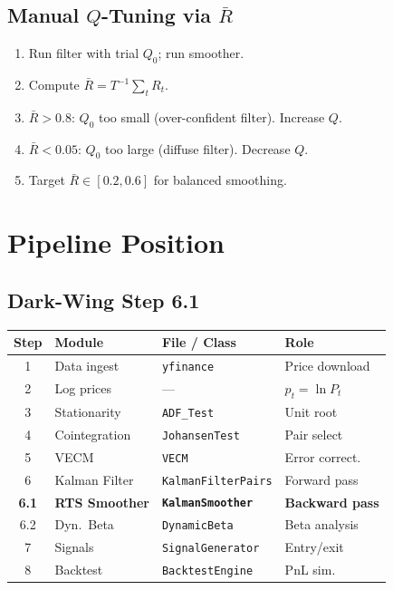 \documentclass[10pt,a4paper,twocolumn]{article}
\begin{document}
\subsection{Manual $Q$-Tuning via $\bar R$}

\begin{enumerate}\setlength\itemsep{1pt}
  \item Run filter with trial $Q_0$; run smoother.
  \item Compute $\bar{R} = T^{-1}\sum_t R_t$.
  \item $\bar{R} > 0.8$: $Q_0$ too small (over-confident filter).
        Increase $Q$.
  \item $\bar{R} < 0.05$: $Q_0$ too large (diffuse filter).
        Decrease $Q$.
  \item Target $\bar{R} \in [0.2, 0.6]$ for balanced smoothing.
\end{enumerate}

\section{Pipeline Position}

\subsection{Dark-Wing Step 6.1}

\begin{center}\small
\begin{tabular}{@{}clp{2.0cm}l@{}}
\toprule
\textbf{Step} & \textbf{Module} & \textbf{File / Class} & \textbf{Role}\\\midrule
1 & Data ingest    & \texttt{yfinance}            & Price download\\
2 & Log prices     & ---                          & $p_t = \ln P_t$\\
3 & Stationarity   & \texttt{ADF\_Test}           & Unit root\\
4 & Cointegration  & \texttt{JohansenTest}        & Pair select\\
5 & VECM           & \texttt{VECM}                & Error correct.\\
6 & Kalman Filter  & \texttt{KalmanFilterPairs}   & Forward pass\\
\textbf{6.1} & \textbf{RTS Smoother}
             & \textbf{\texttt{KalmanSmoother}}   & \textbf{Backward pass}\\
6.2 & Dyn.\ Beta   & \texttt{DynamicBeta}         & Beta analysis\\
7 & Signals        & \texttt{SignalGenerator}     & Entry/exit\\
8 & Backtest       & \texttt{BacktestEngine}      & PnL sim.\\
\bottomrule
\end{tabular}
\end{center}
\end{document}
